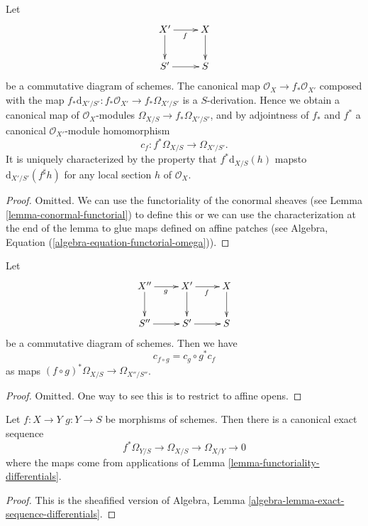 \begin{lemma}
\label{lemma-functoriality-differentials}
Let
$$
\xymatrix{
X' \ar[d] \ar[r]_f & X \ar[d] \\
S' \ar[r] & S
}
$$
be a commutative diagram of schemes. The canonical map
$\mathcal{O}_X \to f_*\mathcal{O}_{X'}$ composed with the map
$f_*\text{d}_{X'/S'} : f_*\mathcal{O}_{X'} \to f_*\Omega_{X'/S'}$ is a
$S$-derivation. Hence we obtain a canonical map of $\mathcal{O}_X$-modules
$\Omega_{X/S} \to f_*\Omega_{X'/S'}$, and by
adjointness of $f_*$ and $f^*$ a
canonical $\mathcal{O}_{X'}$-module homomorphism
$$
c_f : f^*\Omega_{X/S} \longrightarrow \Omega_{X'/S'}.
$$
It is uniquely characterized by the property that
$f^*\text{d}_{X/S}(h)$ mapsto $\text{d}_{X'/S'}(f^\sharp h)$
for any local section $h$ of $\mathcal{O}_X$.
\end{lemma}

\begin{proof}
Omitted. We can use the functoriality of the conormal sheaves
(see Lemma \ref{lemma-conormal-functorial}) to define this or
we can use the characterization
at the end of the lemma to glue maps defined on affine patches
(see Algebra, Equation (\ref{algebra-equation-functorial-omega})).
\end{proof}

\begin{lemma}
\label{lemma-check-functoriality-differentials}
Let
$$
\xymatrix{
X'' \ar[d] \ar[r]_g & X' \ar[d] \ar[r]_f & X \ar[d] \\
S'' \ar[r] & S' \ar[r] & S
}
$$
be a commutative diagram of schemes. Then we have
$$
c_{f \circ g} = c_g \circ g^* c_f
$$
as maps $(f \circ g)^*\Omega_{X/S} \to \Omega_{X''/S''}$.
\end{lemma}

\begin{proof}
Omitted. One way to see this is to restrict to affine opens.
\end{proof}

\begin{lemma}
\label{lemma-triangle-differentials}
Let $f : X \to Y$ $g : Y \to S$ be morphisms of schemes.
Then there is a canonical exact sequence
$$
f^*\Omega_{Y/S} \to \Omega_{X/S} \to \Omega_{X/Y} \to 0
$$
where the maps come from applications of
Lemma \ref{lemma-functoriality-differentials}.
\end{lemma}

\begin{proof}
This is the sheafified version of
Algebra, Lemma \ref{algebra-lemma-exact-sequence-differentials}.
\end{proof}

